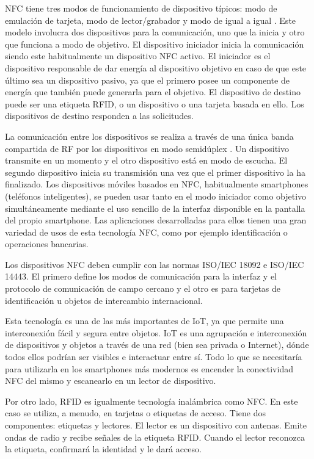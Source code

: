 \documentclass[12pt,a4paper,onecolumn,oneside]{report}
\begin{document}
NFC tiene tres modos de funcionamiento de dispositivo típicos: modo de emulación de tarjeta, modo de lector/grabador y modo de igual a igual \cite{tres}. Este modelo involucra dos dispositivos para la comunicación, uno que la inicia y otro que funciona a modo de objetivo. El dispositivo iniciador inicia la comunicación siendo este habitualmente un dispositivo NFC activo. El iniciador es el dispositivo responsable de dar energía al dispositivo objetivo en caso de que este último sea un dispositivo pasivo, ya que el primero posee un componente de energía que también puede generarla para el objetivo. El dispositivo de destino puede ser una etiqueta RFID, o un dispositivo o una tarjeta basada en ello. Los dispositivos de destino responden a las solicitudes.

La comunicación entre los dispositivos se realiza a través de una única banda compartida de RF por los dispositivos en modo semidúplex \cite{cuatro}. Un dispositivo transmite en un momento y el otro dispositivo está en modo de escucha. El segundo dispositivo inicia su transmisión una vez que el primer dispositivo la ha finalizado. Los dispositivos móviles basados en NFC, habitualmente smartphones (teléfonos inteligentes), se pueden usar tanto en el modo iniciador como objetivo simultáneamente mediante el uso sencillo de la interfaz disponible en la pantalla del propio smartphone. Las aplicaciones desarrolladas para ellos tienen una gran variedad de usos de esta tecnología NFC, como por ejemplo identificación o operaciones bancarias.

Los dispositivos NFC deben cumplir con las normas ISO/IEC 18092 e ISO/IEC 14443. El primero define los modos de comunicación para la interfaz y el protocolo de comunicación de campo cercano y el otro es para tarjetas de identificación u objetos de intercambio internacional.

Esta tecnología es una de las más importantes de IoT, ya que permite una interconexión fácil y segura entre objetos. IoT es una agrupación e interconexión de dispositivos y objetos a través de una red (bien sea privada o Internet), dónde todos ellos podrían ser visibles e interactuar entre sí. Todo lo que se necesitaría para utilizarla en los smartphones más modernos es encender la conectividad NFC del mismo y escanearlo en un lector de dispositivo.

Por otro lado, RFID es igualmente tecnología inalámbrica como NFC. En este caso se utiliza, a menudo, en tarjetas o etiquetas de acceso. Tiene dos componentes: etiquetas y lectores. El lector es un dispositivo con antenas. Emite ondas de radio y recibe señales de la etiqueta RFID. Cuando el lector reconozca la etiqueta, confirmará la identidad y le dará acceso. 
\end{document}
